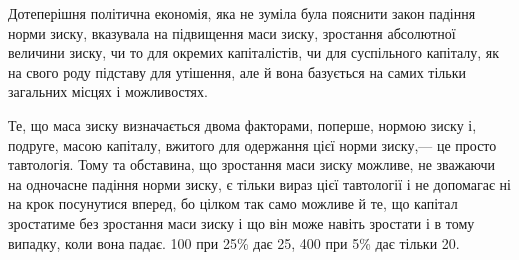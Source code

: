 \documentclass[12pt, a4paper, final]{memoir}
\begin{document}
Дотеперішня політична економія, яка не зуміла була пояснити закон падіння норми зиску, вказувала на підвищення маси зиску, зростання абсолютної величини зиску, чи то для окремих капіталістів, чи для суспільного капіталу, як на свого роду підставу для утішення, але й вона базується на самих тільки загальних місцях і можливостях.

Те, що маса зиску визначається двома факторами, поперше, нормою зиску і, подруге, масою капіталу, вжитого для одержання цієї норми зиску,— це просто тавтологія. Тому та обставина, що зростання маси зиску можливе, не зважаючи на одночасне падіння норми зиску, є тільки вираз цієї тавтології і не допомагає ні на крок посунутися вперед, бо цілком так само можливе й те, що капітал зростатиме без зростання маси зиску і що він може навіть зростати і в тому випадку, коли вона падає. 100 при 25\% дає 25, 400 при 5\% дає тільки 20. 
\end{document}
